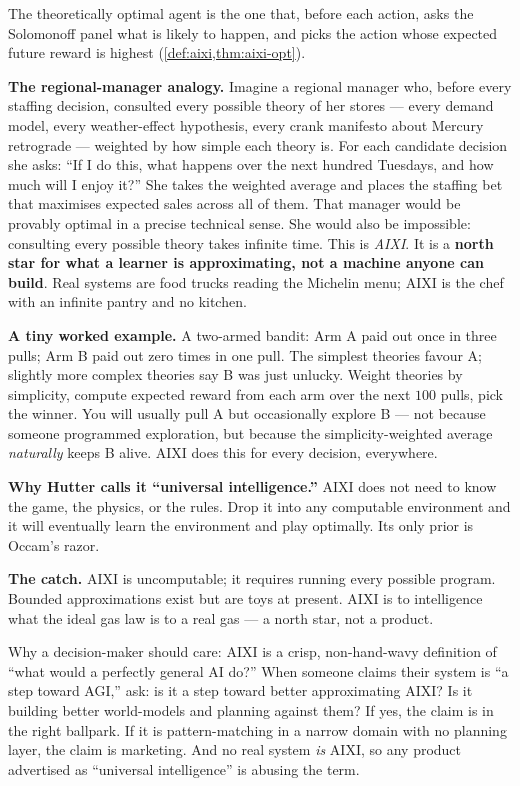 \documentclass[12pt,a4paper]{article}
\theoremstyle{plain}
\theoremstyle{definition}
\begin{document}
\begin{intuition}
The theoretically optimal agent is the one that, before each action,
asks the Solomonoff panel what is likely to happen, and picks the
action whose expected future reward is highest
(\cref{def:aixi,thm:aixi-opt}).

\textbf{The regional-manager analogy.}  Imagine a regional manager
who, before every staffing decision, consulted every possible theory
of her stores --- every demand model, every weather-effect hypothesis,
every crank manifesto about Mercury retrograde --- weighted by how
simple each theory is.  For each candidate decision she asks: ``If I
do this, what happens over the next hundred Tuesdays, and how much
will I enjoy it?''  She takes the weighted average and places the
staffing bet that maximises expected sales across all of them.  That
manager would be provably optimal in a precise technical sense.  She
would also be impossible: consulting every possible theory takes
infinite time.  This is \emph{AIXI}.  It is a \textbf{north star for
what a learner is approximating, not a machine anyone can build}.
Real systems are food trucks reading the Michelin menu; AIXI is the
chef with an infinite pantry and no kitchen.

\textbf{A tiny worked example.}  A two-armed bandit: Arm A paid out
once in three pulls; Arm B paid out zero times in one pull.  The
simplest theories favour A; slightly more complex theories say B was
just unlucky.  Weight theories by simplicity, compute expected reward
from each arm over the next $100$ pulls, pick the winner.  You will
usually pull A but occasionally explore B --- not because someone
programmed exploration, but because the simplicity-weighted average
\emph{naturally} keeps B alive.  AIXI does this for every decision,
everywhere.

\textbf{Why Hutter calls it ``universal intelligence.''}  AIXI does
not need to know the game, the physics, or the rules.  Drop it into
any computable environment and it will eventually learn the
environment and play optimally.  Its only prior is Occam's razor.

\textbf{The catch.}  AIXI is uncomputable; it requires running every
possible program.  Bounded approximations exist but are toys at
present.  AIXI is to intelligence what the ideal gas law is to a
real gas --- a north star, not a product.

Why a decision-maker should care: AIXI is a crisp, non-hand-wavy
definition of ``what would a perfectly general AI do?''  When someone
claims their system is ``a step toward AGI,'' ask: is it a step
toward better approximating AIXI?  Is it building better world-models
and planning against them?  If yes, the claim is in the right
ballpark.  If it is pattern-matching in a narrow domain with no
planning layer, the claim is marketing.  And no real system \emph{is}
AIXI, so any product advertised as ``universal intelligence'' is
abusing the term.
\end{intuition}
\end{document}
